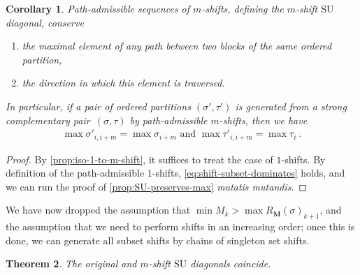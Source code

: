 \documentclass{amsart}
\newtheorem{theorem}{Theorem}[section]
\newtheorem{corollary}[theorem]{Corollary}
\theoremstyle{definition}
\newcommand{\SU}{\mathrm{SU}}
\begin{document}
\begin{corollary} 
\label{cor:SU-shift-preserves-max}
Path-admissible sequences of $m$-shifts, defining the $m$-shift $\SU$ diagonal, conserve 
\begin{enumerate}
	\item the maximal element of any path between two blocks of the same ordered partition,
	\item the direction in which this element is traversed. 
\end{enumerate}
In particular, if a pair of ordered partitions $(\sigma',\tau')$ is generated from a strong complementary pair~$(\sigma,\tau)$ by path-admissible $m$-shifts, then we have
\begin{align}
	\label{eq:max-3}
	\max \sigma'_{i,i+m} = \max \sigma_{i+m} \text{ and } \max \tau'_{i,i+m} = \max \tau_{i} \ .
\end{align}
\end{corollary}

\begin{proof}
By \cref{prop:iso-1-to-m-shift}, it suffices to treat the case of $1$-shifts. 
By definition of the path-admissible $1$-shifts, \cref{eq:shift-subset-dominates} holds, and we can run the proof of \cref{prop:SU-preserves-max} \emph{mutatis mutandis}.
\end{proof}

We have now dropped the assumption that $\min M_k > \max R_{\mathbf{M}}(\sigma)_{k+1}$, and the assumption that we need to perform shifts in an increasing order; once this is done, we can generate all subset shifts by chains of singleton set shifts.

\begin{theorem}
\label{prop:iso-original-shift-diagonals}
The original and $m$-shift $\SU$ diagonals coincide.
\end{theorem}
\end{document}
